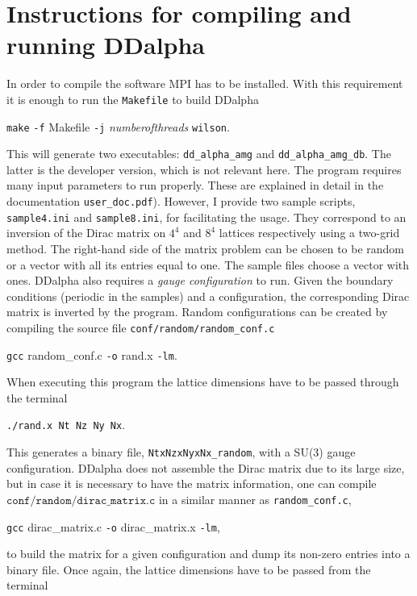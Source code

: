 \documentclass[a4paper,12pt]{scrartcl}
\begin{document}
\section{Instructions for compiling and running DDalpha}
In order to compile the software MPI has to be installed. With this requirement it is enough to run the \texttt{Makefile} to build DDalpha   \begin{center}
\texttt{make} \texttt{-f} Makefile \texttt{-j} \textit{numberofthreads} \texttt{wilson}.
\end{center}This will generate two executables: \texttt{dd\_alpha\_amg} and \texttt{dd\_alpha\_amg\_db}. The latter is the developer version, which is not relevant here. The program requires many input parameters to run properly. These are explained in detail in the documentation \texttt{user\_doc.pdf}). However, I provide two sample scripts, \texttt{sample4.ini} and \texttt{sample8.ini}, for facilitating the usage. They correspond to an inversion of the Dirac matrix on $4^4$ and $8^4$ lattices respectively using a two-grid method. The right-hand side of the matrix problem can be chosen to be random or a vector with all its entries equal to one. The sample files choose a vector with ones. DDalpha also requires a \textit{gauge configuration} to run. Given the boundary conditions (periodic in the samples) and a configuration, the corresponding Dirac matrix  is inverted by the program. Random configurations can be created by compiling the source file \texttt{conf/random/random\_conf.c} \begin{center}
\texttt{gcc} random\_conf.c \texttt{-o} rand.x \texttt{-lm}.
\end{center}When executing this program the lattice dimensions have to be passed through the terminal\begin{center}
 \texttt{./rand.x Nt Nz Ny Nx}.
\end{center}This generates a binary file, \texttt{NtxNzxNyxNx\_random}, with a SU(3) gauge configuration. DDalpha does not assemble the Dirac matrix due to its large size, but in case it is necessary to have the matrix information, one can compile $\texttt{conf/random/dirac\_matrix.c}$ in a similar manner as \texttt{random\_conf.c},\begin{center}
\texttt{gcc} dirac\_matrix.c \texttt{-o} dirac\_matrix.x \texttt{-lm},
\end{center}to build the matrix for a given configuration and dump its non-zero entries into a binary file. Once again, the lattice dimensions have to be passed from the terminal \begin{center}

\end{center}
\end{document}
